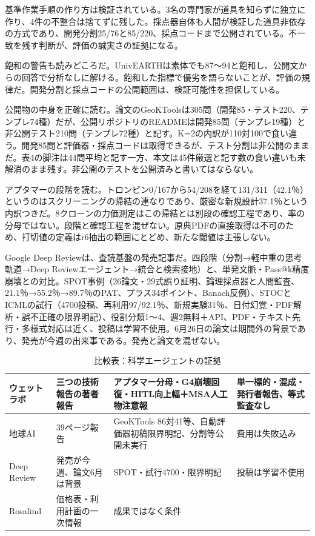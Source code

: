 \documentclass[lualatex,a4paper,10pt]{jlreq}
\begin{document}
基準作業手順の作り方は検証されている。3名の専門家が道具を知らずに独立に作り、4件の不整合は捨てずに残した。採点器自体も人間が検証した道具非依存の方式であり、開発分割25/76と85/220、採点コードまで公開されている。不一致を残す判断が、評価の誠実さの証拠になる。
\cite{B47,B84,B48}


飽和の警告も読みどころだ。UnivEARTHは素体でも87〜94と飽和し、公開文からの回答で分析なしに解ける。飽和した指標で優劣を語らないことが、評価の規律だ。開発分割と採点コードの公開範囲は、検証可能性を担保している。
\cite{B47,B84,B48}


公開物の中身を正確に読む。論文のGeoKToolsは305問（開発85・テスト220、テンプレ74種）だが、公開リポジトリのREADMEは開発85問（テンプレ19種）と非公開テスト210問（テンプレ72種）と記す。K=2の内訳が110対100で食い違う。開発85問と評価器・採点コードは取得できるが、テスト分割は非公開のままだ。表4の脚注は44問平均と記す一方、本文は45件厳選と記す数の食い違いも未解消のまま残す。非公開のテストを公開済みと書いてはならない。
\cite{B47,B84,B48,B61}


アプタマーの段階を読む。トロンビン0/167から54/208を経て131/311（42.1％）というのはスクリーニングの帰結の連なりであり、厳密な新規設計37.1％という内訳つきだ。8クローンの力価測定はこの帰結とは別段の確認工程であり、率の分母ではない。段階と確認工程を混ぜない。原典PDFの直接取得は不可のため、打切値の定義はr6抽出の範囲にとどめ、新たな閾値は主張しない。
\cite{B46,B83,B44,B43,B45}


Google Deep Reviewは、査読基盤の発売記事だ。四段階（分割→軽中重の思考軌道→Deep Reviewエージェント→統合と検索接地）と、単発文脈・Pass@k精度崩壊との対比。SPOT事例（26論文・29式誤り証明、論理採点器と人間監査、21.1％→55.2％→89.7％のPAT、プラス34ポイント、Banach反例）、STOCとICMLの試行（4700投稿、再利用97/92.1％、新規実験31％、日付幻覚・PDF解析・誤不正確の限界明記）、役割分類1〜4、週2無料＋API、PDF・テキスト先行・多様式対応は近く、投稿は学習不使用。6月26日の論文は期間外の背景であり、発売が今週の出来事である。発売と論文を混ぜない。
\cite{B50,B85,B49}


\begin{table}[htbp]\centering\footnotesize
\caption{比較表：科学エージェントの証拠}
\begin{tabularx}{0.96\linewidth}{@{}lXXX@{}}
\toprule
ウェットラボ & 三つの技術報告の著者報告 & アプタマー分母・G4崩壊回復・HITL向上幅＋MSA人工物注意報 & 単一標的・混成・発行者報告、等式監査なし \cite{B46,B83,B44,B43} \\
\midrule
地球AI & 39ページ報告 & GeoKTools 86対41等、自動評価器初稿限界明記、分割等公開未実行 & 費用は失敗込み \cite{B47,B84,B48} \\
\midrule
Deep Review & 発売が今週、論文6月は背景 & SPOT・試行4700・限界明記 & 投稿は学習不使用 \cite{B50,B85,B49} \\
\midrule
Rosalind & 価格表・利用計画の一次情報 & 成果ではなく条件 \cite{B51,B86} \\
\bottomrule
\end{tabularx}
\end{table}
\end{document}
